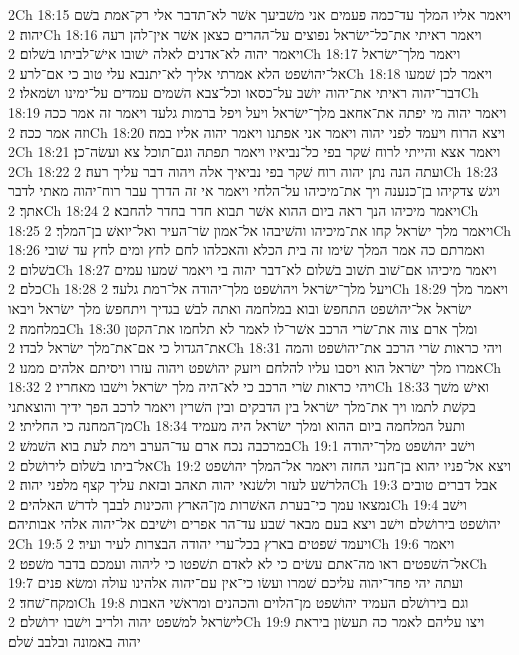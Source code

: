 2Ch 18:15  ויאמר אליו המלך עד־כמה פעמים אני משׁביעך אשׁר לא־תדבר אלי רק־אמת בשׁם יהוה׃
2Ch 18:16  ויאמר ראיתי את־כל־ישׂראל נפוצים על־ההרים כצאן אשׁר אין־להן רעה ויאמר יהוה לא־אדנים לאלה ישׁובו אישׁ־לביתו בשׁלום׃
2Ch 18:17  ויאמר מלך־ישׂראל אל־יהושׁפט הלא אמרתי אליך לא־יתנבא עלי טוב כי אם־לרע׃
2Ch 18:18  ויאמר לכן שׁמעו דבר־יהוה ראיתי את־יהוה יושׁב על־כסאו וכל־צבא השׁמים עמדים על־ימינו ושׂמאלו׃
2Ch 18:19  ויאמר יהוה מי יפתה את־אחאב מלך־ישׂראל ויעל ויפל ברמות גלעד ויאמר זה אמר ככה וזה אמר ככה׃
2Ch 18:20  ויצא הרוח ויעמד לפני יהוה ויאמר אני אפתנו ויאמר יהוה אליו במה׃
2Ch 18:21  ויאמר אצא והייתי לרוח שׁקר בפי כל־נביאיו ויאמר תפתה וגם־תוכל צא ועשׂה־כן׃
2Ch 18:22  ועתה הנה נתן יהוה רוח שׁקר בפי נביאיך אלה ויהוה דבר עליך רעה׃
2Ch 18:23  ויגשׁ צדקיהו בן־כנענה ויך את־מיכיהו על־הלחי ויאמר אי זה הדרך עבר רוח־יהוה מאתי לדבר אתך׃
2Ch 18:24  ויאמר מיכיהו הנך ראה ביום ההוא אשׁר תבוא חדר בחדר להחבא׃
2Ch 18:25  ויאמר מלך ישׂראל קחו את־מיכיהו והשׁיבהו אל־אמון שׂר־העיר ואל־יואשׁ בן־המלך׃
2Ch 18:26  ואמרתם כה אמר המלך שׂימו זה בית הכלא והאכלהו לחם לחץ ומים לחץ עד שׁובי בשׁלום׃
2Ch 18:27  ויאמר מיכיהו אם־שׁוב תשׁוב בשׁלום לא־דבר יהוה בי ויאמר שׁמעו עמים כלם׃
2Ch 18:28  ויעל מלך־ישׂראל ויהושׁפט מלך־יהודה אל־רמת גלעד׃
2Ch 18:29  ויאמר מלך ישׂראל אל־יהושׁפט התחפשׂ ובוא במלחמה ואתה לבשׁ בגדיך ויתחפשׂ מלך ישׂראל ויבאו במלחמה׃
2Ch 18:30  ומלך ארם צוה את־שׂרי הרכב אשׁר־לו לאמר לא תלחמו את־הקטן את־הגדול כי אם־את־מלך ישׂראל לבדו׃
2Ch 18:31  ויהי כראות שׂרי הרכב את־יהושׁפט והמה אמרו מלך ישׂראל הוא ויסבו עליו להלחם ויזעק יהושׁפט ויהוה עזרו ויסיתם אלהים ממנו׃
2Ch 18:32  ויהי כראות שׂרי הרכב כי לא־היה מלך ישׂראל וישׁבו מאחריו׃
2Ch 18:33  ואישׁ משׁך בקשׁת לתמו ויך את־מלך ישׂראל בין הדבקים ובין השׁרין ויאמר לרכב הפך ידיך והוצאתני מן־המחנה כי החליתי׃
2Ch 18:34  ותעל המלחמה ביום ההוא ומלך ישׂראל היה מעמיד במרכבה נכח ארם עד־הערב וימת לעת בוא השׁמשׁ׃
2Ch 19:1  וישׁב יהושׁפט מלך־יהודה אל־ביתו בשׁלום לירושׁלם׃
2Ch 19:2  ויצא אל־פניו יהוא בן־חנני החזה ויאמר אל־המלך יהושׁפט הלרשׁע לעזר ולשׂנאי יהוה תאהב ובזאת עליך קצף מלפני יהוה׃
2Ch 19:3  אבל דברים טובים נמצאו עמך כי־בערת האשׁרות מן־הארץ והכינות לבבך לדרשׁ האלהים׃
2Ch 19:4  וישׁב יהושׁפט בירושׁלם וישׁב ויצא בעם מבאר שׁבע עד־הר אפרים וישׁיבם אל־יהוה אלהי אבותיהם׃
2Ch 19:5  ויעמד שׁפטים בארץ בכל־ערי יהודה הבצרות לעיר ועיר׃
2Ch 19:6  ויאמר אל־השׁפטים ראו מה־אתם עשׂים כי לא לאדם תשׁפטו כי ליהוה ועמכם בדבר משׁפט׃
2Ch 19:7  ועתה יהי פחד־יהוה עליכם שׁמרו ועשׂו כי־אין עם־יהוה אלהינו עולה ומשׂא פנים ומקח־שׁחד׃
2Ch 19:8  וגם בירושׁלם העמיד יהושׁפט מן־הלוים והכהנים ומראשׁי האבות לישׂראל למשׁפט יהוה ולריב וישׁבו ירושׁלם׃
2Ch 19:9  ויצו עליהם לאמר כה תעשׂון ביראת יהוה באמונה ובלבב שׁלם׃
